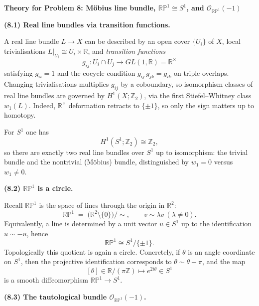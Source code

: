 \begin{solution}


\par\medskip\noindent\textbf{Theory for Problem 8: M\"{o}bius line bundle, $\mathbb{RP}^1 \cong S^1$, and $\mathcal{O}_{\mathbb{RP}^1}(-1)$}\par\smallskip


\par\medskip\noindent\textbf{(8.1) Real line bundles via transition functions.}\par\smallskip

A real line bundle $L\to X$ can be described by an open cover $\{U_i\}$ of $X$, local trivialisations
$L|_{U_i}\cong U_i\times \mathbb{R}$, and \emph{transition functions}
\[
g_{ij}:U_i\cap U_j \longrightarrow GL(1,\mathbb{R})=\mathbb{R}^\times
\]
satisfying $g_{ii}=1$ and the cocycle condition $g_{ij}\,g_{jk}=g_{ik}$ on triple overlaps.
Changing trivialisations multiplies $g_{ij}$ by a coboundary, so isomorphism classes of real line bundles
are governed by $H^1(X;\mathbb{Z}_2)$, via the first Stiefel--Whitney class $w_1(L)$.
Indeed, $\mathbb{R}^\times$ deformation retracts to $\{\pm 1\}$, so only the sign matters up to homotopy.

For $S^1$ one has
\[
H^1(S^1;\mathbb{Z}_2)\cong \mathbb{Z}_2,
\]
so there are exactly two real line bundles over $S^1$ up to isomorphism: the trivial bundle and the
nontrivial (M\"{o}bius) bundle, distinguished by $w_1=0$ versus $w_1\neq 0$.

\par\medskip\noindent\textbf{(8.2) $\mathbb{RP}^1$ is a circle.}\par\smallskip

Recall $\mathbb{RP}^1$ is the space of lines through the origin in $\mathbb{R}^2$:
\[
\mathbb{RP}^1 \;=\; \bigl(\mathbb{R}^2\setminus\{0\}\bigr)/\sim,\qquad v\sim \lambda v\ (\lambda\neq 0).
\]
Equivalently, a line is determined by a unit vector $u\in S^1$ up to the identification $u\sim -u$, hence
\[
\mathbb{RP}^1 \cong S^1/\{\pm 1\}.
\]
Topologically this quotient is again a circle. Concretely, if $\theta$ is an angle coordinate on $S^1$,
then the projective identification corresponds to $\theta\sim \theta+\pi$, and the map
\[
[\theta]\in \mathbb{R}/(\pi\mathbb{Z}) \longmapsto e^{2i\theta}\in S^1
\]
is a smooth diffeomorphism $\mathbb{RP}^1\to S^1$.

\par\medskip\noindent\textbf{(8.3) The tautological bundle $\mathcal{O}_{\mathbb{RP}^1}(-1)$.}\par\smallskip


\end{solution}
